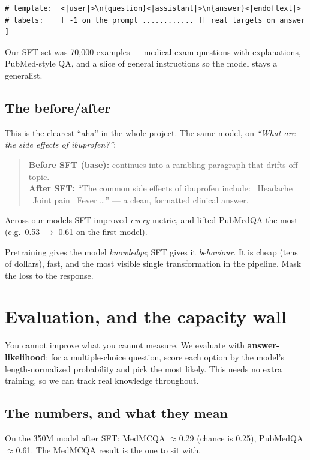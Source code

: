 \begin{lstlisting}
# template:  <|user|>\n{question}<|assistant|>\n{answer}<|endoftext|>
# labels:    [ -1 on the prompt ............ ][ real targets on answer ]
\end{lstlisting}

\noindent Our SFT set was 70{,}000 examples --- medical exam questions with explanations, PubMed-style QA, and
a slice of general instructions so the model stays a generalist.

\section{The before/after}
This is the clearest ``aha'' in the whole project. The same model, on \emph{``What are the side effects of
ibuprofen?''}:

\begin{quote}\small
\textbf{Before SFT (base):} continues into a rambling paragraph that drifts off topic.\\[3pt]
\textbf{After SFT:} ``The common side effects of ibuprofen include: \textbullet\ Headache \textbullet\ Joint
pain \textbullet\ Fever \ldots'' --- a clean, formatted clinical answer.
\end{quote}

\noindent Across our models SFT improved \emph{every} metric, and lifted PubMedQA the most (e.g.\ 0.53
$\rightarrow$ 0.61 on the first model).

\begin{lesson}
Pretraining gives the model \emph{knowledge}; SFT gives it \emph{behaviour}. It is cheap (tens of dollars),
fast, and the most visible single transformation in the pipeline. Mask the loss to the response.
\end{lesson}

\chapter{Evaluation, and the capacity wall}

You cannot improve what you cannot measure. We evaluate with \textbf{answer-likelihood}: for a multiple-choice
question, score each option by the model's length-normalized probability and pick the most likely. This needs
no extra training, so we can track real knowledge throughout.

\section{The numbers, and what they mean}
On the 350M model after SFT: MedMCQA $\approx$0.29 (chance is 0.25), PubMedQA $\approx$0.61. The MedMCQA result
is the one to sit with.


